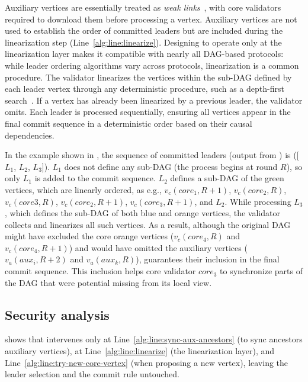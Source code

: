 Auxiliary vertices are essentially treated as \emph{weak links}~\cite{dag-rider}, with core validators required to download them before processing a vertex. Auxiliary vertices are not used to establish the order of committed leaders but are included during the linearization step (Line~\ref{alg:line:linearize}). Designing \sysname to operate only at the linearization layer makes it compatible with nearly all DAG-based protocols: while leader ordering algorithms vary across protocols, linearization is a common procedure. The validator linearizes the vertices within the sub-DAG defined by each leader vertex through any deterministic procedure, such as a depth-first search~\cite{dag-rider}. If a vertex has already been linearized by a previous leader, the validator omits. Each leader is processed sequentially, ensuring all vertices appear in the final commit sequence in a deterministic order based on their causal dependencies.

In the example shown in , the sequence of committed leaders (output from ) is ([$L_1$, $L_2$, $L_3$]).
$L_{1}$ does not define any sub-DAG (the process begins at round $R$), so only $L_1$ is added to the commit sequence.
$L_{2}$ defines a sub-DAG of the green vertices, which are linearly ordered, as e.g., $v_c(core_1,R+1)$, $v_c(core_2,R)$, $v_c(core3,R)$, $v_c(core_2,R+1)$, $v_c(core_3,R+1)$, and $L_2$.
While processing $L_3$, which defines the sub-DAG of both blue and orange vertices, the validator collects and linearizes all such vertices. As a result, although the original DAG might have excluded the core orange vertices ($v_c(core_4, R)$ and $v_c(core_4, R+1)$) and would have omitted the auxiliary vertices ($v_a(aux_i,R+2)$ and $v_a(aux_k,R)$), \sysname guarantees their inclusion in the final commit sequence. This inclusion helps core validator $core_3$ to synchronize parts of the DAG that were potential missing from its local view.

\subsection{Security analysis} \label{sec:security}
 shows that \sysname intervenes only at Line~\ref{alg:line:sync-aux-ancestors} (to sync ancestors auxiliary vertices), at Line~\ref{alg:line:linearize} (the linearization layer), and Line~\ref{alg:line:try-new-core-vertex} (when proposing a new vertex), leaving the leader selection and the commit rule untouched.

